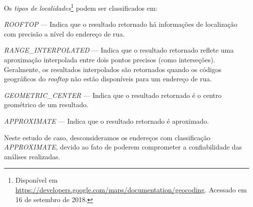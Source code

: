\documentclass[
	12pt,				%
	oneside,			%
	a4paper,			%
	english,			%
	brazil				%
	]{abntex2ppgsi}
\begin{document}
{{{Os \textit{tipos de localidades}\footnote{Disponível em \url{https://developers.google.com/maps/documentation/geocoding}. Acessado em 16 de setembro de 2018.}  podem ser classificados em:
\begin{enumerate*}
\item \textit{ROOFTOP} --- Indica que o resultado retornado há informações de localização com precisão a nível do endereço de rua.
\item \textit{RANGE\_INTERPOLATED} --- Indica que o resultado retornado reflete uma aproximação interpolada entre dois pontos precisos (como interseções). Geralmente, os resultados interpolados são retornados quando os códigos geográficos do \textit{rooftop} não estão disponíveis para um endereço de rua.
\item \textit{GEOMETRIC\_CENTER} --- Indica que o resultado retornado é o centro geométrico de um resultado.
\item \textit{APPROXIMATE} --- Indica que o resultado retornado é aproximado.
\end{enumerate*}

Neste estudo de caso, desconsideramos os endereços com classificação \textit{APPROXIMATE}, devido ao fato de poderem comprometer a confiabilidade das análises realizadas. 

}}}
\end{document}
